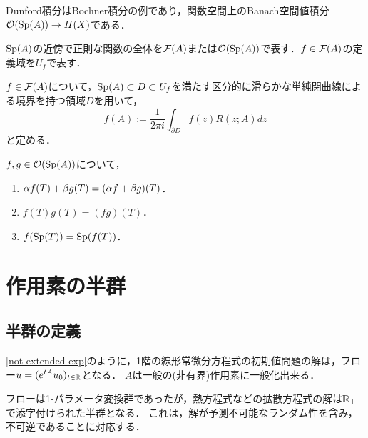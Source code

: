 \documentclass[uplatex,dvipdfmx]{jsreport}
\begin{document}
\begin{tcolorbox}[colframe=ForestGreen, colback=ForestGreen!10!white,breakable,colbacktitle=ForestGreen!40!white,coltitle=black,fonttitle=\bfseries\sffamily,
title=]
    Dunford積分はBochner積分の例であり，関数空間上のBanach空間値積分$\mathcal{O}(\mathrm{Sp}(A))\to H(X)$である．
\end{tcolorbox}

\begin{notation}
    $\mathrm{Sp}(A)$の近傍で正則な関数の全体を$\mathcal{F}(A)$または$\mathcal{O}(\mathrm{Sp}(A))$で表す．$f\in\mathcal{F}(A)$の定義域を$U_f$で表す．
\end{notation}

\begin{definition}
    $f\in\mathcal{F}(A)$について，$\mathrm{Sp}(A)\subset D\subset U_f$を満たす区分的に滑らかな単純閉曲線による境界を持つ領域$D$を用いて，
    \[f(A):=\frac{1}{2\pi i}\int_{\partial D}f(z)R(z;A)dz\]
    と定める．
\end{definition}

\begin{lemma}
    $f,g\in\mathcal{O}(\mathrm{Sp}(A))$について，
    \begin{enumerate}
        \item $\alpha f(T)+\beta g(T)=(\alpha f+\beta g)(T)$．
        \item $f(T)g(T)=(fg)(T)$．
        \item $f(\mathrm{Sp}(T))=\mathrm{Sp}(f(T))$．
    \end{enumerate}
\end{lemma}

\section{作用素の半群}

\subsection{半群の定義}

\begin{tcolorbox}[colframe=ForestGreen, colback=ForestGreen!10!white,breakable,colbacktitle=ForestGreen!40!white,coltitle=black,fonttitle=\bfseries\sffamily,
title=]
    \ref{not-extended-exp}のように，1階の線形常微分方程式の初期値問題の解は，フロー$u=(e^{tA}u_0)_{t\in\mathbb{R}}$となる．
    $A$は一般の(非有界)作用素に一般化出来る．

    フローは1-パラメータ変換群であったが，熱方程式などの拡散方程式の解は$\mathbb{R}_+$で添字付けられた半群となる．
    これは，解が予測不可能なランダム性を含み，不可逆であることに対応する．
\end{tcolorbox}
\end{document}
